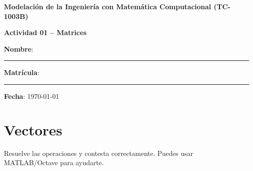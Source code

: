 \documentclass[spanish, 10pt]{article}
\begin{document}
\begin{center}
	{\Large \textbf{Modelación de la Ingeniería con Matemática Computacional (TC-1003B)}}
	
	\bigskip
	{\large \textbf{Actividad 01 -- Matrices}}
\end{center}

\bigskip
{\large \textbf{Nombre}: \rule{13.7 cm}{0.4mm}}



\bigskip
{\large \textbf{Matrícula}: \rule{5 cm}{0.4mm}} \hfill {\large \textbf{Fecha}: \today}

\bigskip


\section{Vectores}

Resuelve las operaciones y contesta correctamente. Puedes usar MATLAB/Octave para ayudarte.

\vspace{3ex}
\end{document}

